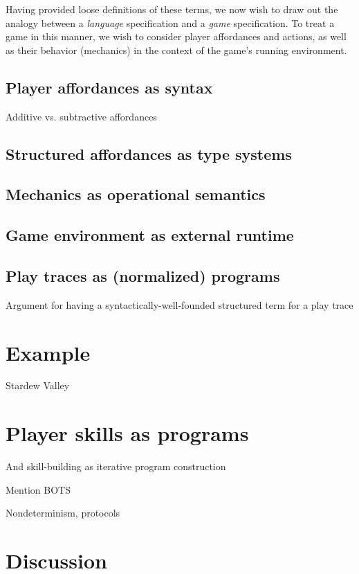 \documentclass[sigconf]{acmart}
\begin{document}
  Having provided loose definitions of these terms, we now wish to draw out
  the analogy between a {\em language} specification and a {\em game}
  specification. To treat a game in this manner, we wish to consider player
  affordances and actions, as well as their behavior (mechanics) in the
  context of the game's running environment.

  \subsection{Player affordances as syntax}

  Additive vs. subtractive affordances

  \subsection{Structured affordances as type systems}

  \subsection{Mechanics as operational semantics}

  \subsection{Game environment as external runtime}

  \subsection{Play traces as (normalized) programs}
  
  Argument for having a syntactically-well-founded structured term for a
  play trace

  
\section{Example}

Stardew Valley

\section{Player skills as programs}

And skill-building as iterative program construction

Mention BOTS

Nondeterminism, protocols

\section{Discussion}
\end{document}
